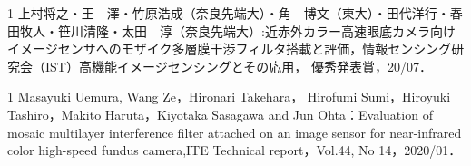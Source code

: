 
\begin{受賞}{1}
上村将之・王　澤・竹原浩成（奈良先端大）・角　博文（東大）・田代洋行・春田牧人・笹川清隆・太田　淳（奈良先端大）:近赤外カラー高速眼底カメラ向けイメージセンサへのモザイク多層膜干渉フィルタ搭載と評価，情報センシング研究会（IST）高機能イメージセンシングとその応用， 優秀発表賞，20/07．

\end{受賞}

\begin{発表}{1}
Masayuki Uemura, Wang Ze，Hironari Takehara， Hirofumi Sumi，Hiroyuki Tashiro，Makito Haruta，Kiyotaka Sasagawa and Jun Ohta：Evaluation of mosaic multilayer interference filter attached on an image sensor for near-infrared color high-speed fundus camera,ITE Technical report，Vol.44, No 14，2020/01．

\end{発表}
